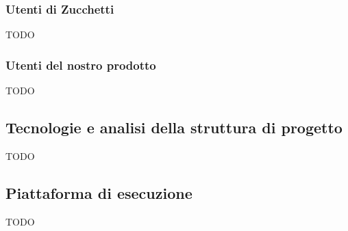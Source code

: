\subsubsection{Utenti di Zucchetti}
TODO
\subsubsection{Utenti del nostro prodotto}
TODO

\subsection{Tecnologie e analisi della struttura di progetto}
TODO

\subsection{Piattaforma di esecuzione}
TODO

